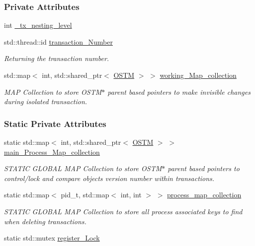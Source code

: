 \subsubsection*{Private Attributes}
\begin{DoxyCompactItemize}
\item 
int \hyperlink{class_t_x_ae8f413fd7f4fea322e7ad3c668f9898e_ae8f413fd7f4fea322e7ad3c668f9898e}{\+\_\+tx\+\_\+nesting\+\_\+level}
\item 
std\+::thread\+::id \hyperlink{class_t_x_a145a1c74b521f277fe481971a930b249_a145a1c74b521f277fe481971a930b249}{transaction\+\_\+\+Number}
\begin{DoxyCompactList}\small\item\em Returning the transaction number. \end{DoxyCompactList}\item 
std\+::map$<$ int, std\+::shared\+\_\+ptr$<$ \hyperlink{class_o_s_t_m}{O\+S\+TM} $>$ $>$ \hyperlink{class_t_x_a81aafda16e2f20e36ec6c68e584668ff_a81aafda16e2f20e36ec6c68e584668ff}{working\+\_\+\+Map\+\_\+collection}
\begin{DoxyCompactList}\small\item\em M\+AP Collection to store O\+S\+T\+M$\ast$ parent based pointers to make invisible changes during isolated transaction. \end{DoxyCompactList}\end{DoxyCompactItemize}
\subsubsection*{Static Private Attributes}
\begin{DoxyCompactItemize}
\item 
static std\+::map$<$ int, std\+::shared\+\_\+ptr$<$ \hyperlink{class_o_s_t_m}{O\+S\+TM} $>$ $>$ \hyperlink{class_t_x_a1a45d726894190695314464d7cd97c29_a1a45d726894190695314464d7cd97c29}{main\+\_\+\+Process\+\_\+\+Map\+\_\+collection}
\begin{DoxyCompactList}\small\item\em S\+T\+A\+T\+IC G\+L\+O\+B\+AL M\+AP Collection to store O\+S\+T\+M$\ast$ parent based pointers to control/lock and compare objects version number within transactions. \end{DoxyCompactList}\item 
static std\+::map$<$ pid\+\_\+t, std\+::map$<$ int, int $>$ $>$ \hyperlink{class_t_x_aea5b8eedcd5059384155576b3979a5f6_aea5b8eedcd5059384155576b3979a5f6}{process\+\_\+map\+\_\+collection}
\begin{DoxyCompactList}\small\item\em S\+T\+A\+T\+IC G\+L\+O\+B\+AL M\+AP Collection to store all process associated keys to find when deleting transactions. \end{DoxyCompactList}\item 
static std\+::mutex \hyperlink{class_t_x_aa688a8c96fa3cdf8cd92e267463536dc_aa688a8c96fa3cdf8cd92e267463536dc}{register\+\_\+\+Lock}
\end{DoxyCompactItemize}
